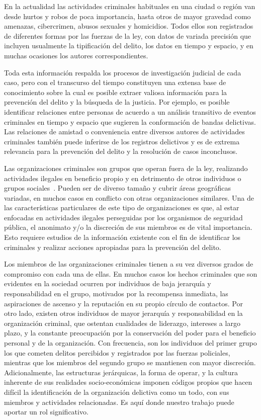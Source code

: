 
En la actualidad las actividades criminales habituales en una ciudad o región van desde hurtos y robos de poca importancia, hasta otros de mayor gravedad como amenazas, cibercrimen, abusos sexuales y  homicidios. Todos ellos son registrados de diferentes formas por las fuerzas de la ley, con datos de variada precisión que incluyen usualmente la tipificación del delito, los datos en tiempo y espacio, y en muchas ocasiones los autores correspondientes.

Toda esta información respalda los procesos de investigación judicial de cada caso, pero con el transcurso del tiempo constituyen una extensa base de conocimiento sobre la cual es posible extraer valiosa información para la prevención del delito y la búsqueda de la justicia. Por ejemplo, es posible identificar relaciones entre personas de acuerdo a un análisis transitivo de eventos criminales en tiempo y espacio que sugieren la conformación de bandas delictivas. Las relaciones de amistad o conveniencia entre diversos autores de actividades criminales también puede inferirse de los registros delictivos y es de extrema relevancia para la prevención del delito y la resolución de casos inconclusos.

Las organizaciones criminales son grupos que operan fuera de la ley, realizando actividades ilegales en beneficio propio y en detrimento de otros individuos o grupos sociales~\cite{finckenauer2005problems}. Pueden ser de diverso tamaño y cubrir áreas geográficas variadas, en muchos casos en conflicto con otras organizaciones similares. Una de las características particulares de este tipo de organizaciones es que, al estar enfocadas en actividades ilegales perseguidas por los organismos de seguridad pública, el anonimato y/o la discreción de sus miembros es de vital importancia. Esto requiere estudios de la información existente con el fin de identificar los criminales y realizar acciones apropiadas para la prevención del delito.

Los miembros de las organizaciones criminales tienen a su vez diversos grados de compromiso con cada una de ellas. En muchos casos los hechos criminales que son evidentes en la sociedad ocurren por individuos de baja jerarquía y responsabilidad en el grupo, motivados por la recompensa inmediata, las aspiraciones de ascenso y la reputación en su propio círculo de contactos. Por otro lado, existen otros individuos de mayor jerarquía y responsabilidad en la organización criminal, que ostentan cualidades de liderazgo, intereses a largo plazo, y la constante preocupación por la conservación del poder para el beneficio personal y de la organización. Con frecuencia, son los individuos del primer grupo los que cometen delitos percibidos y registrados por las fuerzas policiales, mientras que los miembros del segundo grupo se mantienen con mayor discreción. Adicionalmente, las estructuras jerárquicas, la forma de operar, y la cultura inherente de sus realidades socio-económicas  imponen códigos propios que hacen difícil la identificación de la organización delictiva como un todo, con sus miembros y actividades relacionadas. Es aquí donde nuestro trabajo puede aportar un rol significativo.

